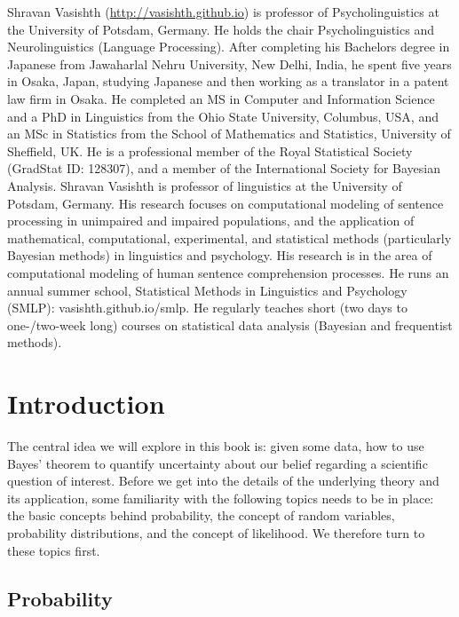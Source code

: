 \documentclass[12pt,]{krantz}
\theoremstyle{definition}
\theoremstyle{definition}
\theoremstyle{definition}
\theoremstyle{remark}
\begin{document}
Shravan Vasishth (\url{http://vasishth.github.io}) is professor of Psycholinguistics at the University of Potsdam, Germany. He holds the
chair Psycholinguistics and Neurolinguistics (Language Processing). After completing his Bachelors degree in Japanese from Jawaharlal Nehru University, New Delhi, India, he spent five years in Osaka, Japan, studying Japanese and then working as a translator in a patent law firm in Osaka. He completed an MS in Computer and Information Science and a PhD in Linguistics from the Ohio State University, Columbus, USA, and an MSc in Statistics from the School of Mathematics and Statistics, University of Sheffield, UK. He is a professional member of the Royal Statistical Society (GradStat ID: 128307), and a member of the International Society for Bayesian Analysis.
Shravan Vasishth is professor of linguistics at the University of Potsdam, Germany. His research focuses on computational modeling of sentence processing in unimpaired and impaired populations, and the application of mathematical, computational, experimental, and statistical methods (particularly Bayesian methods) in linguistics and psychology.
His research is in the area of computational modeling of human sentence comprehension processes. He runs an annual summer school, Statistical Methods in Linguistics and Psychology (SMLP): vasishth.github.io/smlp. He regularly teaches short (two days to one-/two-week long) courses on statistical data analysis (Bayesian and frequentist methods).

\mainmatter

\hypertarget{introduction}{%
\chapter{Introduction}\label{introduction}}

The central idea we will explore in this book is: given some data, how to use Bayes' theorem to quantify uncertainty about our belief regarding a scientific question of interest. Before we get into the details of the underlying theory and its application, some familiarity with the following topics needs to be in place: the basic concepts behind probability, the concept of random variables, probability distributions, and the concept of likelihood. We therefore turn to these topics first.

\hypertarget{introprob}{%
\section{Probability}\label{introprob}}
\end{document}
